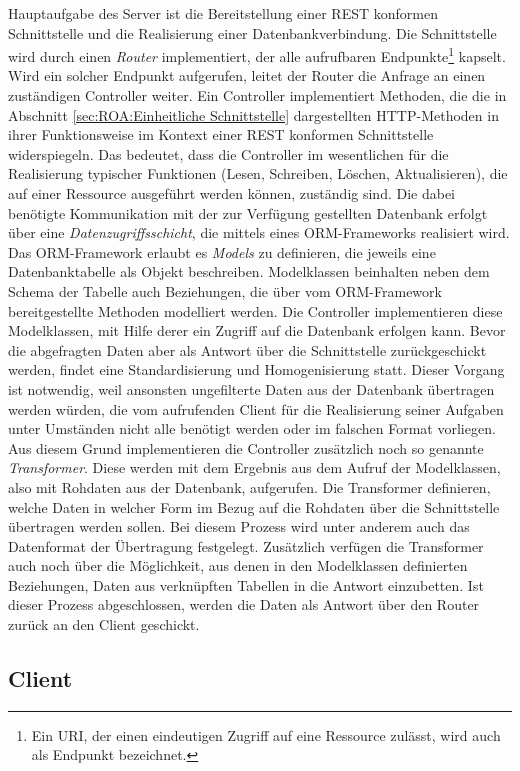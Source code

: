 Hauptaufgabe des Server ist die Bereitstellung einer REST konformen Schnittstelle und die Realisierung einer Datenbankverbindung. Die Schnittstelle wird durch einen \emph{Router} implementiert, der alle aufrufbaren Endpunkte\footnote{Ein \acf{URI}, der einen eindeutigen Zugriff auf eine Ressource zulässt, wird auch als Endpunkt bezeichnet.} kapselt. Wird ein solcher Endpunkt aufgerufen, leitet der Router die Anfrage an einen zuständigen Controller weiter. Ein Controller implementiert Methoden, die die in Abschnitt \ref{sec:ROA:Einheitliche Schnittstelle} dargestellten HTTP-Methoden in ihrer Funktionsweise im Kontext einer REST konformen Schnittstelle widerspiegeln. Das bedeutet, dass die Controller im wesentlichen für die Realisierung typischer Funktionen (Lesen, Schreiben, Löschen, Aktualisieren), die auf einer Ressource ausgeführt werden können, zuständig sind. Die dabei benötigte Kommunikation mit der zur Verfügung gestellten Datenbank erfolgt über eine \emph{Datenzugriffsschicht}, die mittels eines ORM-Frameworks realisiert wird. Das ORM-Framework erlaubt es \emph{Models} zu definieren, die jeweils eine Datenbanktabelle als Objekt beschreiben. Modelklassen beinhalten neben dem Schema der Tabelle auch Beziehungen, die über vom ORM-Framework bereitgestellte Methoden modelliert werden. Die Controller implementieren diese Modelklassen, mit Hilfe derer ein Zugriff auf die Datenbank erfolgen kann. Bevor die abgefragten Daten aber als Antwort über die Schnittstelle zurückgeschickt werden, findet eine Standardisierung und Homogenisierung statt. Dieser Vorgang ist notwendig, weil ansonsten ungefilterte Daten aus der Datenbank übertragen werden würden, die vom aufrufenden Client für die Realisierung seiner Aufgaben unter Umständen nicht alle benötigt werden oder im falschen Format vorliegen. Aus diesem Grund implementieren die Controller zusätzlich noch so genannte \emph{Transformer}. Diese werden mit dem Ergebnis aus dem Aufruf der Modelklassen, also mit Rohdaten aus der Datenbank, aufgerufen. Die Transformer definieren, welche Daten in welcher Form im Bezug auf die Rohdaten über die Schnittstelle übertragen werden sollen. Bei diesem Prozess wird unter anderem auch das Datenformat der Übertragung festgelegt. Zusätzlich verfügen die Transformer auch noch über die Möglichkeit, aus denen in den Modelklassen definierten Beziehungen, Daten aus verknüpften Tabellen in die Antwort einzubetten. Ist dieser Prozess abgeschlossen, werden die Daten als Antwort über den Router zurück an den Client geschickt.

\subsection{Client}
\label{sec:Entwurf:Client}

